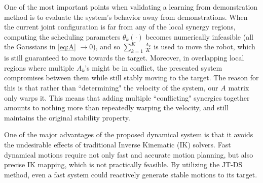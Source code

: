 \documentclass[letterpaper, 10 pt, conference,fleqn]{ieeeconf}
\begin{document}
One of the most important points when validating a learning from demonstration method is to evaluate the system's behavior away from demonstrations. When the current joint configuration is far from any of the local synergy regions, computing the scheduling parameters $\theta_k(\cdot)$ becomes numerically infeasible (all the Gaussians in \eqref{eq:A} $\rightarrow 0$), and so $\sum\limits_{k=1}^{K}\frac{A_k}{K}$ is used to move the robot, which is still guaranteed to move towards the target. Moreover, in overlapping local regions where multiple $A_k$'s might be in conflict, the presented system compromises between them while still stably moving to the target. The reason for this is that rather than ``determining" the velocity of the system, our $A$ matrix only warps it. This means that adding multiple ``conflicting" synergies together amounts to nothing more than repeatedly warping the velocity, and still maintains the original stability property. 

One of the major advantages of the proposed dynamical system is that it avoids the undesirable effects of traditional Inverse Kinematic (IK) solvers. Fast dynamical motions require not only fast and accurate motion planning, but also precise IK mapping, which is not practically feasible. By utilizing the JT-DS method, even a fast system could reactively generate stable motions to its target.
\end{document}
